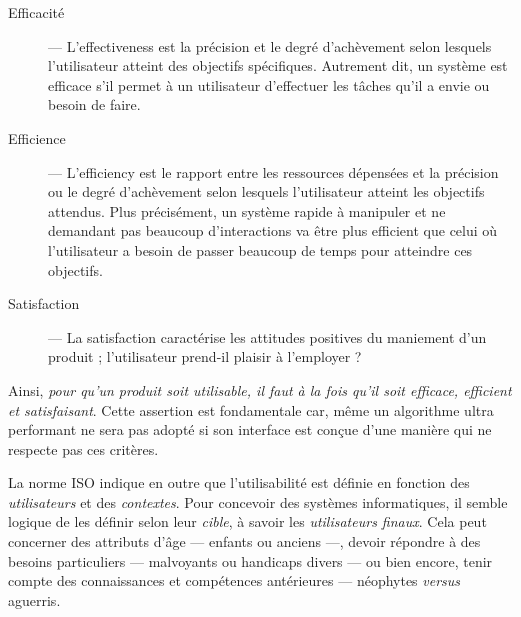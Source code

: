 \begin{description}
	\item[Efficacité] --- L'\gls{effectiveness} est la précision et le degré d'achèvement selon lesquels l'utilisateur atteint des objectifs spécifiques. Autrement dit, un système est efficace s'il permet à un utilisateur d'effectuer les tâches qu'il a envie ou besoin de faire.
	\item[Efficience] --- L'\gls{efficiency} est le rapport entre les ressources dépensées et la précision ou le degré 
d'achèvement selon lesquels l'utilisateur atteint les objectifs attendus. Plus précisément, un système rapide à manipuler et ne demandant pas beaucoup d'interactions va être plus efficient que celui où l'utilisateur a besoin de passer beaucoup de temps pour atteindre ces objectifs.
	\item[Satisfaction] --- La \gls{satisfaction} caractérise les attitudes positives du maniement d'un produit ; l'utilisateur prend-il plaisir à l'employer ?
\end{description}

Ainsi, \textit{pour qu'un produit soit utilisable, il faut à la fois qu'il soit efficace, efficient et satisfaisant}. Cette assertion est fondamentale car, même un algorithme ultra performant ne sera pas adopté si son interface est conçue d'une manière qui ne respecte pas ces critères.

La norme ISO indique en outre que l'utilisabilité est définie en fonction des \emph{utilisateurs} et des \emph{contextes}.
Pour concevoir des systèmes informatiques, il semble logique de les définir selon leur \emph{cible}, à savoir les \emph{utilisateurs finaux}. Cela peut concerner des attributs d'âge --- enfants ou anciens ---, devoir répondre à des besoins particuliers --- malvoyants ou handicaps divers --- ou bien encore, tenir compte des connaissances et compétences antérieures --- néophytes \textit{versus} aguerris. 


